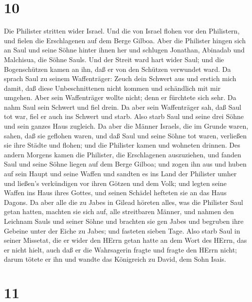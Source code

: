 \hypertarget{section-9}{%
\section{10}\label{section-9}}

 Die Philister stritten wider Israel. Und die von Israel
flohen vor den Philistern, und fielen die Erschlagenen auf dem Berge
Gilboa.  Aber die Philister hingen sich an Saul und seine
Söhne hinter ihnen her und schlugen Jonathan, Abinadab und Malchisua,
die Söhne Sauls.  Und der Streit ward hart wider Saul; und
die Bogenschützen kamen an ihn, daß er von den Schützen verwundet ward.
 Da sprach Saul zu seinem Waffenträger: Zeuch dein Schwert
aus und erstich mich damit, daß diese Unbeschnittenen nicht kommen und
schändlich mit mir umgehen. Aber sein Waffenträger wollte nicht; denn er
fürchtete sich sehr. Da nahm Saul sein Schwert und fiel drein.
 Da aber sein Waffenträger sah, daß Saul tot war, fiel er
auch ins Schwert und starb.  Also starb Saul und seine drei
Söhne und sein ganzes Haus zugleich.  Da aber die Männer
Israels, die im Grunde waren, sahen, daß sie geflohen waren, und daß
Saul und seine Söhne tot waren, verließen sie ihre Städte und flohen;
und die Philister kamen und wohneten drinnen.  Des andern
Morgens kamen die Philister, die Erschlagenen auszuziehen, und fanden
Saul und seine Söhne liegen auf dem Berge Gilboa;  und zogen
ihn aus und huben auf sein Haupt und seine Waffen und sandten es ins
Land der Philister umher und ließen's verkündigen vor ihren Götzen und
dem Volk;  und legten seine Waffen ins Haus ihres Gottes,
und seinen Schädel hefteten sie an das Haus Dagons.  Da
aber alle die zu Jabes in Gilead höreten alles, was die Philister Saul
getan hatten,  machten sie sich auf, alle streitbaren
Männer, und nahmen den Leichnam Sauls und seiner Söhne und brachten sie
gen Jabes und begruben ihre Gebeine unter der Eiche zu Jabes; und
fasteten sieben Tage.  Also starb Saul in seiner Missetat,
die er wider den HErrn getan hatte an dem Wort des HErrn, das er nicht
hielt, auch daß er die Wahrsagerin fragte  und fragte den
HErrn nicht; darum tötete er ihn und wandte das Königreich zu David, dem
Sohn Isais.

\hypertarget{section-10}{%
\section{11}\label{section-10}}

